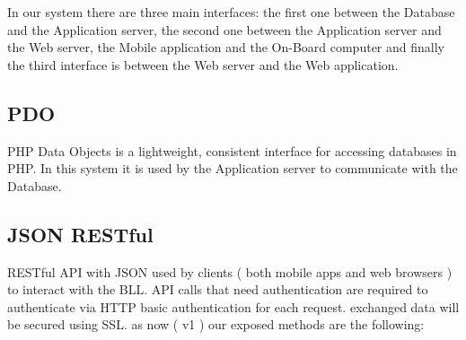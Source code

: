 
In our system there are three main interfaces: the first one between the Database and the Application server, the second one between the Application server and the Web server, the Mobile application and the On-Board computer and finally the third interface is between the Web server and the Web application.

\subsection{PDO}
PHP Data Objects is a lightweight, consistent interface for accessing databases in PHP. In this system it is used by the Application server to communicate with the Database.
 	
\subsection{JSON RESTful}
RESTful API with JSON used by clients ( both mobile apps and web
browsers ) to interact with the BLL. API calls that need authentication are
required to authenticate via HTTP basic authentication for each request. exchanged
data will be secured using SSL.
as now ( v1 ) our exposed methods are the following:



